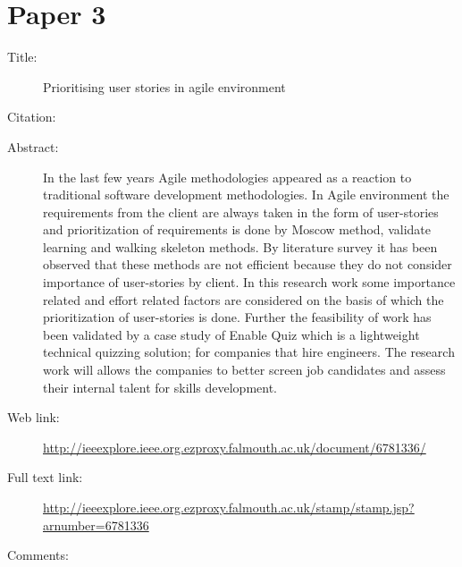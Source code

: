 \documentclass{scrartcl}
\begin{document}
\section*{Paper 3}
\begin{description}
\item[Title:] Prioritising user stories in agile environment
\item[Citation:] \cite{popli2014prioritising}
\item[Abstract:] In the last few years Agile methodologies appeared as a reaction to traditional software development methodologies. In Agile environment the requirements from the client are always taken in the form of user-stories and prioritization of requirements is done by Moscow method, validate learning and walking skeleton methods. By literature survey it has been observed that these methods are not efficient because they do not consider importance of user-stories by client. In this research work some importance related and effort related factors are considered on the basis of which the prioritization of user-stories is done. Further the feasibility of work has been validated by a case study of Enable Quiz which is a lightweight technical quizzing solution; for companies that hire engineers. The research work will allows the companies to better screen job candidates and assess their internal talent for skills development.
\item[Web link:]\url {http://ieeexplore.ieee.org.ezproxy.falmouth.ac.uk/document/6781336/}
\item[Full text link:] \url{http://ieeexplore.ieee.org.ezproxy.falmouth.ac.uk/stamp/stamp.jsp?arnumber=6781336}
\item[Comments:]  
\end{description}
\end{document}
